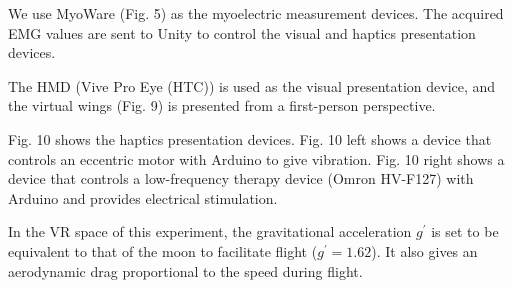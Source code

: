 \documentclass[letterpaper, 10 pt, conference]{ieeeconf}  %
\begin{document}
                We use MyoWare (Fig. 5) as the myoelectric measurement devices.  
                The acquired EMG values are sent to Unity to control the visual and haptics presentation devices.  

                The HMD (Vive Pro Eye (HTC)) is used as the visual presentation device, and the virtual wings (Fig. 9) is presented from a first-person perspective.  

                
                Fig. 10 shows the haptics presentation devices.  
                Fig. 10 left shows a device that controls an eccentric motor with Arduino to give vibration.  
                Fig. 10 right shows a device that controls a low-frequency therapy device (Omron HV-F127) with Arduino and provides electrical stimulation.  

                In the VR space of this experiment, the gravitational acceleration $g^{\prime}$ is set to be equivalent to that of the moon 
                to facilitate flight ($g^{\prime}=1.62$).
                It also gives an aerodynamic drag 
                proportional to the speed
                during flight.  
\end{document}
